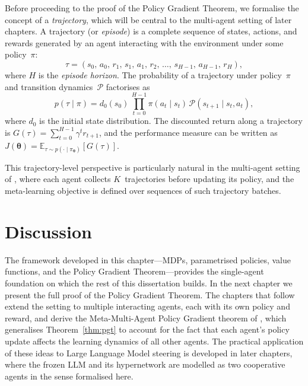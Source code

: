 \documentclass[a4paper,oneside,11pt]{report}
\begin{document}
Before proceeding to the proof of the Policy Gradient Theorem, we formalise the concept of a \emph{trajectory}, which will be central to the multi-agent setting of later chapters. A trajectory (or \emph{episode}) is a complete sequence of states, actions, and rewards generated by an agent interacting with the environment under some policy~$\pi$:
\begin{equation}\label{eq:trajectory}
  \tau = (s_0,\, a_0,\, r_1,\, s_1,\, a_1,\, r_2,\, \ldots,\, s_{H-1},\, a_{H-1},\, r_H),
\end{equation}
where $H$ is the \emph{episode horizon}. The probability of a trajectory under policy~$\pi$ and transition dynamics~$\mathcal{P}$ factorises as
\begin{equation}\label{eq:trajectory-prob}
  p(\tau \mid \pi) = d_0(s_0)\,\prod_{t=0}^{H-1} \pi(a_t\mid s_t)\,\mathcal{P}(s_{t+1}\mid s_t,a_t),
\end{equation}
where $d_0$ is the initial state distribution. The discounted return along a trajectory is $G(\tau) = \sum_{t=0}^{H-1}\gamma^t r_{t+1}$, and the performance measure can be written as $J(\bm{\theta}) = \mathbb{E}_{\tau\sim p(\cdot\mid\pi_{\bm{\theta}})}[G(\tau)]$.

This trajectory-level perspective is particularly natural in the multi-agent setting of \cite{kim2021policygradientalgorithmlearning}, where each agent collects $K$~trajectories before updating its policy, and the meta-learning objective is defined over sequences of such trajectory batches.

\section{Discussion}
\label{sec:ch3-discussion}

The framework developed in this chapter---MDPs, parametrised policies, value functions, and the Policy Gradient Theorem---provides the single-agent foundation on which the rest of this dissertation builds. In the next chapter we present the full proof of the Policy Gradient Theorem. The chapters that follow extend the setting to multiple interacting agents, each with its own policy and reward, and derive the Meta-Multi-Agent Policy Gradient theorem of \cite{kim2021policygradientalgorithmlearning}, which generalises Theorem~\ref{thm:pgt} to account for the fact that each agent's policy update affects the learning dynamics of all other agents. The practical application of these ideas to Large Language Model steering is developed in later chapters, where the frozen LLM and its hypernetwork are modelled as two cooperative agents in the sense formalised here.
\end{document}
